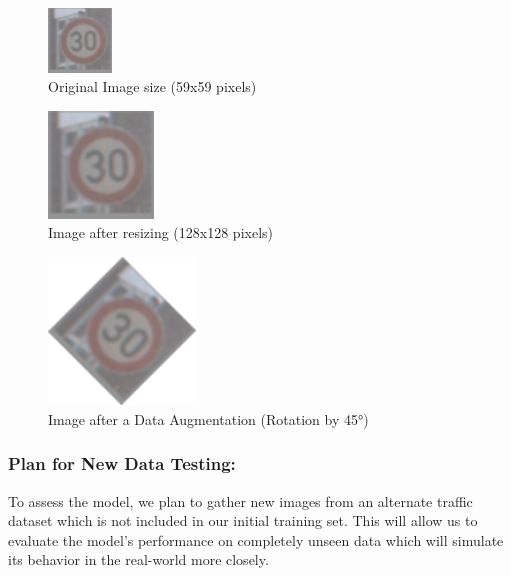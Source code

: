 \documentclass{article} %
\begin{document}
\label{gen_inst}
\begin{figure}[h]
\begin{center}
\includegraphics[width=0.15\textwidth]{Figs/Traffic signal (original img).png}
\end{center}
\caption{Original Image size (59x59 pixels)}
\end{figure}

\label{gen_inst}
\begin{figure}[h]
\begin{center}
\includegraphics[width=0.25\textwidth]{Figs/Traffic signal (resized img).png}
\end{center}
\caption{Image after resizing (128x128 pixels)}
\end{figure}

\label{gen_inst}
\begin{figure}[h]
\begin{center}
\includegraphics[width=0.35\textwidth]{Figs/rotated 30.png}
\end{center}
\caption{Image after a Data Augmentation (Rotation by 45°)}
\end{figure}



\subsubsection{Plan for New Data Testing:}
To assess the model, we plan to gather new images from an alternate traffic dataset which is not included in our initial training set. This will allow us to evaluate the model’s performance on completely unseen data which will simulate its behavior in the real-world more closely.
\end{document}
